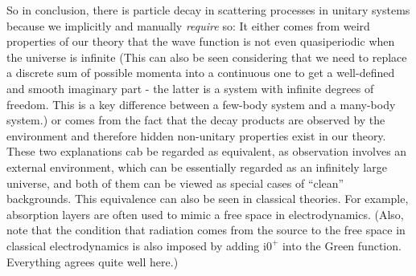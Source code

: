 \documentclass[hyperref, a4paper]{article}
\newcommand*{\ii}{\mathrm{i}}
\newenvironment{qanda}{\setlength{\parindent}{0pt}}{\bigskip}
\begin{document}
\begin{qanda}
So in conclusion, there is particle decay in scattering processes in unitary systems because we implicitly and manually \emph{require} so: 
It either comes from weird properties of our theory that the wave function is not even quasiperiodic 
when the universe is infinite (This can also be seen considering that we need to replace a discrete sum of possible momenta into a continuous one to get a well-defined and smooth imaginary part - the latter is a system with infinite degrees of freedom. This is a key difference between a few-body system and a many-body system.) or comes from the fact that the decay products are observed by the environment and therefore hidden non-unitary properties exist in our theory.
These two explanations cab be regarded as equivalent, as observation involves an external environment, 
which can be essentially regarded as an infinitely large universe, 
and both of them can be viewed as special cases of ``clean'' backgrounds.
This equivalence can also be seen in classical theories. 
For example, absorption layers are often used to mimic a free space in electrodynamics. 
(Also, note that the condition that radiation comes from the source to the free space in classical electrodynamics is also imposed by adding $\ii 0^+$ into the Green function. Everything agrees quite well here.)


\end{qanda}
\end{document}
